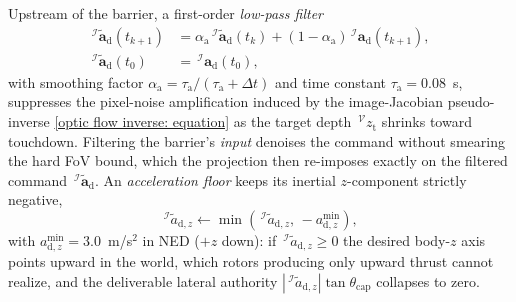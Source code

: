 \documentclass{IEEEtaes}
\begin{document}
Upstream of the barrier, a first-order \emph{low-pass filter}
\begin{align} \label{lpf: equation}
    \,^\mathcal{I}\!\tilde{\boldsymbol{a}}_\text{d}(t_{k+1}) &= \alpha_\text{a}\,^\mathcal{I}\!\tilde{\boldsymbol{a}}_\text{d}(t_k)+(1-\alpha_\text{a})\,^\mathcal{I}\!\boldsymbol{a}_\text{d}(t_{k+1}), \nonumber\\
    \,^\mathcal{I}\!\tilde{\boldsymbol{a}}_\text{d}(t_0) &= \,^\mathcal{I}\!\boldsymbol{a}_\text{d}(t_0),
\end{align}
with smoothing factor $\alpha_\text{a}=\tau_\text{a}/(\tau_\text{a}+\Delta t)$ and time constant $\tau_\text{a}=0.08$~s, suppresses the pixel-noise amplification induced by the image-Jacobian pseudo-inverse \eqref{optic flow inverse: equation} as the target depth $\,^\mathcal{V}z_\text{t}$ shrinks toward touchdown. Filtering the barrier's \emph{input} denoises the command without smearing the hard FoV bound, which the projection then re-imposes exactly on the filtered command $\,^\mathcal{I}\tilde{\boldsymbol{a}}_\text{d}$. An \emph{acceleration floor} keeps its inertial $z$-component strictly negative,
\begin{equation} \label{acceleration floor: equation}
    \,^\mathcal{I}\tilde{a}_{\text{d},z}\leftarrow \min(\,^\mathcal{I}\tilde{a}_{\text{d},z},\,-a_{\text{d},z}^{\min}),
\end{equation}
with $a_{\text{d},z}^{\min}=3.0$~m/s$^2$ in NED ($+z$ down): if $\,^\mathcal{I}\tilde{a}_{\text{d},z}\ge 0$ the desired body-$z$ axis points upward in the world, which rotors producing only upward thrust cannot realize, and the deliverable lateral authority $|\,^\mathcal{I}\tilde{a}_{\text{d},z}|\tan\theta_\text{cap}$ collapses to zero.
\end{document}

